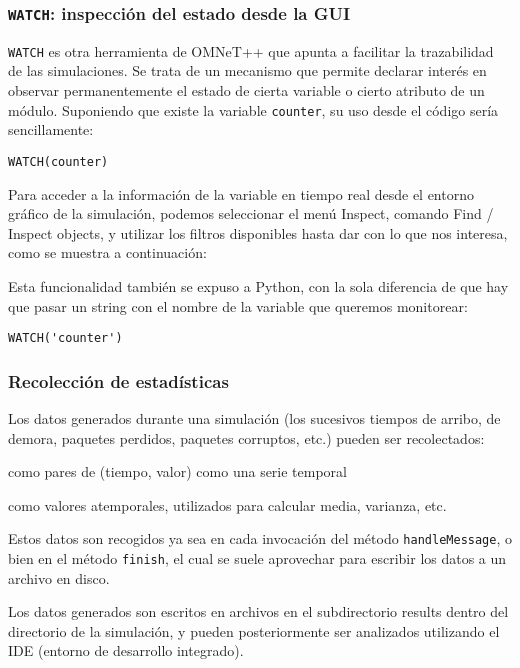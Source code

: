 \documentclass[]{article}
\begin{document}
\subsubsection{\texttt{WATCH}: inspección del estado desde la GUI}

\verb!WATCH! es otra herramienta de OMNeT++ que apunta a facilitar la
trazabilidad de las simulaciones. Se trata de un mecanismo que permite declarar
interés en observar permanentemente el estado de cierta variable o cierto
atributo de un módulo. Suponiendo que existe la variable \verb!counter!, su uso
desde el código sería sencillamente:

\begin{verbatim}
WATCH(counter)
\end{verbatim}

Para acceder a la información de la variable en tiempo real desde el entorno
gráfico de la simulación, podemos seleccionar el menú Inspect, comando Find /
Inspect objects, y utilizar los filtros disponibles hasta dar con lo que nos
interesa, como se muestra a continuación:


Esta funcionalidad también se expuso a Python, con la sola diferencia de que
hay que pasar un string con el nombre de la variable que queremos monitorear:

\begin{verbatim}
WATCH('counter')
\end{verbatim}

\subsubsection{Recolección de estadísticas}

Los datos generados durante una simulación (los sucesivos tiempos de arribo, de
demora, paquetes perdidos, paquetes corruptos, etc.) pueden ser recolectados:

como pares de (tiempo, valor) como una serie temporal

como valores atemporales, utilizados para calcular media, varianza, etc.

Estos datos son recogidos ya sea en cada invocación del método
\verb!handleMessage!, o bien en el método \verb!finish!, el cual se suele
aprovechar para escribir los datos a un archivo en disco.

Los datos generados son escritos en archivos en el subdirectorio results dentro
del directorio de la simulación, y pueden posteriormente ser analizados
utilizando el IDE (entorno de desarrollo integrado).
\end{document}

